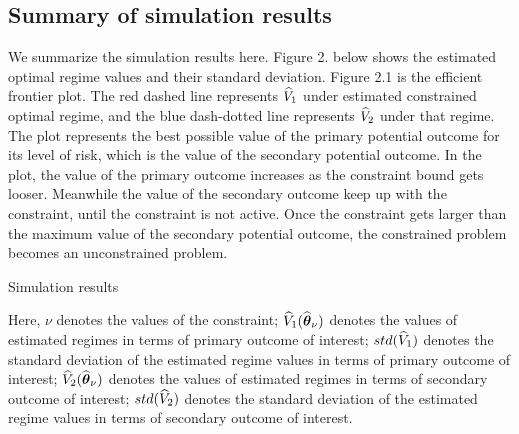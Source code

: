 \subsection{Summary of simulation results}
We summarize the simulation results here. Figure 2. below shows the estimated optimal regime values and their standard deviation. Figure 2.1 is the efficient frontier plot. The red dashed line represents $\widehat{V}_1$ under estimated constrained optimal regime, and the blue dash-dotted line represents $\widehat{V}_2$ under that regime. The plot represents the best possible value of the primary potential outcome for its level of risk, which is the value of the secondary potential outcome. In the plot, the value of the primary outcome increases as the constraint bound gets looser. Meanwhile the value of the secondary outcome keep up with the constraint, until the constraint is not active. Once the constraint gets larger than the maximum value of the secondary potential outcome, the constrained problem becomes an unconstrained problem. \\
\begin{center}
\begin{table}[!htbp]
\caption{Simulation results}
	\centering
{\tt
	
}
\justify
Here, $\nu$ denotes the values of the constraint; $\widehat{V}_1(\widehat{\boldsymbol{\theta}}_{\nu})$ denotes the values of estimated regimes in terms of primary outcome of interest; $std(\widehat{V}_1)$ denotes the standard deviation of the estimated regime values in terms of primary outcome of interest; $\widehat{V}_2(\widehat{\boldsymbol{\theta}}_{\nu})$ denotes the values of estimated regimes in terms of secondary outcome of interest; $std(\widehat{V}_2)$ denotes the standard deviation of the estimated regime values in terms of secondary outcome of interest.
\end{table}
\end{center}
